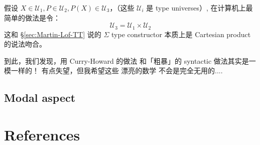 假设 $X \in \mathcal{U}_1, P \in \mathcal{U}_2, P(X) \in \mathcal{U}_3$，（这些 $\mathcal{U}_i$ 是 type universes）, 在计算机上最简单的做法是令：
\begin{equation}
\mathcal{U}_3 = \mathcal{U}_1 \times \mathcal{U}_2
\end{equation}
这和 \S\ref{sec:Martin-Lof-TT} 说的 $\Sigma$ type constructor 本质上是 Cartesian product 的说法吻合。

到此，我们发现，用 Curry-Howard 的做法 和「粗暴」的 syntactic 做法其实是一模一样的！ 有点失望，但我希望这些 漂亮的数学 不会是完全无用的....

\subsection{Modal aspect}

\section*{References}
 \smiley \\ \vspace*{0.4cm}
\printbibliography

 
